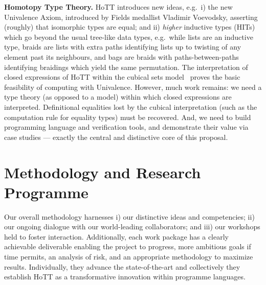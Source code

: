 \documentclass[a4paper,11pt]{article}
\newcommand{\eg}{{e.g.}\ }
\begin{document}
{\bf Homotopy Type Theory.} HoTT introduces new ideas, \eg i) the new
Univalence Axiom, introduced by Fields medallist Vladimir Voevodsky,
asserting (roughly) that isomorphic types are equal; and ii)
\emph{higher} inductive types (HITs) which go beyond the usual
tree-like data types, \eg while lists are an inductive type, braids
are lists with extra paths identifying lists up to twisting of any
element past its neighbours, and bags are braids with
paths-between-paths identifying braidings which yield the same
permutation.  The interpretation of closed expressions of HoTT within
the cubical sets model~\cite{BezemM:cubsmt, nominal} proves the basic
feasibility of computing with Univalence.  However, much work remains:
we need a type theory (as opposed to a model) within which closed
expressions are interpreted.  Definitional equalities lost by the
cubical interpretation (such as the computation rule for equality
types) must be recovered. And, we need to build programming
language and verification tools, and demonstrate their value via case
studies --- exactly the central and distinctive core of this proposal.

\vspace*{-0.2in}

\section{Methodology and Research Programme}
\vspace*{-0.1in}

Our overall methodology harnesses i) our distinctive ideas and
competencies; ii) our ongoing dialogue with our
world-leading collaborators; and iii) our workshops held to foster
interaction. Additionally, each work package has a
clearly achievable deliverable enabling the project to progress, more
ambitious goals if time permits, an analysis of risk, and an
appropriate methodology to maximize results. Individually, they
advance the state-of-the-art and collectively they
establish HoTT as a transformative innovation within programme languages.
\end{document}
